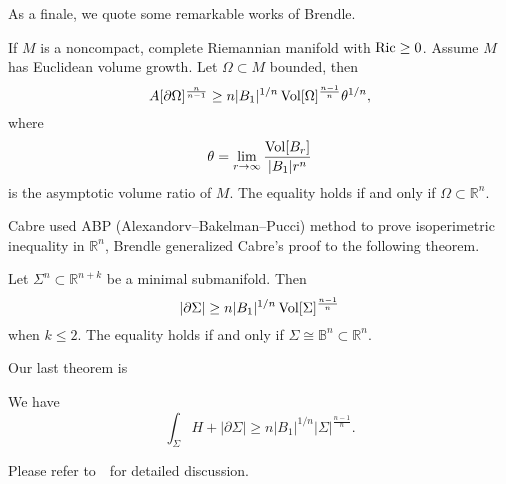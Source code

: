 As a finale, we quote some remarkable works of Brendle.

\begin{thm}[Brendle]
    If $M$ is a noncompact, complete Riemannian manifold with $\operatorname{Ric}\geq 0$.
    Assume $M$ has Euclidean volume growth.
    Let $\Omega\subset M$ bounded, then
    \[A[\partial\Omega]^{\frac{n}{n-1}}\geq n|B_1|^{1/n}\operatorname{Vol}[\Omega]^{\frac{n-1}{n}}\theta^{1/n},\]
    where
    \[\theta=\lim_{r\to\infty}\frac{\operatorname{Vol}[B_r]}{|B_1|r^n}\]
    is the asymptotic volume ratio of $M$.
    The equality holds if and only if $\Omega\subset\mathbb{R}^n$.
\end{thm}

Cabre used ABP (Alexandorv--Bakelman--Pucci) method to prove isoperimetric inequality in $\mathbb{R}^n$, Brendle generalized Cabre's proof to the following theorem.

\begin{thm}[Brendle]
    Let $\Sigma^n\subset\mathbb{R}^{n+k}$ be a minimal submanifold.
    Then
    \[|\partial\Sigma|\geq n|B_1|^{1/n}\operatorname{Vol}[\Sigma]^{\frac{n-1}{n}}\]
    when $k\leq 2$.
    The equality holds if and only if $\Sigma\cong\mathbb{B}^n\subset\mathbb{R}^n$.
\end{thm}

Our last theorem is

\begin{thm}[Brendle]
    We have
    \[\int_\Sigma H+|\partial\Sigma|\geq n|B_1|^{1/n}|\Sigma|^\frac{n-1}{n}.\]
\end{thm}

Please refer to~\cite{Brendle-Eichmair}~for detailed discussion.